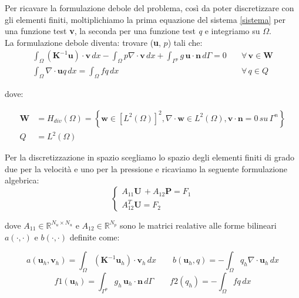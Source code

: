 Per ricavare la formulazione debole del problema, così da poter discretizzare con gli elementi finiti, moltiplichiamo la prima equazione del sistema \ref{sistema} per una funzione test \textbf{v}, la seconda per una funzione test \textit{q} e integriamo su $\Omega$. \\
La formulazione debole diventa: trovare (\textbf{u}, $p$) tali che:
\begin{equation}
\begin{split}
\int_{\Omega} (\textbf{K}^{-1} \textbf{u}) \cdot \textbf{v} \, dx  - \int_{\Omega} p \nabla \cdot \textbf{v} \, dx  + \int_{\Gamma^p} g \, \textbf{u} \cdot \textbf{n} \, d\Gamma = 0 & \quad  \forall \, \textbf{v} \in \textbf{W} \\
\int_{\Omega} \nabla \cdot \textbf{u} q \, dx = \int_{\Omega} f q \, dx & \quad \forall \, q \in Q
\end{split}
\end{equation}\label{formdebole}

dove: 

\begin{equation*}
\begin{split}
\textbf{W} &=H_{div}(\Omega) = \left \{ \textbf{w}\in [L^2(\Omega)]^2, \nabla \cdot \textbf{w} \in L^2(\Omega), \textbf{v} \cdot \textbf{n} = 0 \, su \, \Gamma^n \right \} \\
Q &= L^2(\Omega) 
\end{split}
\end{equation*}

Per la discretizzazione in spazio scegliamo lo spazio degli elementi finiti di grado due per la velocità e uno per la pressione e ricaviamo la seguente formulazione algebrica:
\begin{equation}
\begin{cases}
A_{11} \textbf{U} \, +A_{12} \textbf{P} = F_1 \\
A_{12}^T \textbf{U} = F_2
\end{cases}
\end{equation}


dove $ A_{11} \in \mathbb{R}^{N_u \times N_u}$ e $A_{12} \in \mathbb{R}^{N_p}$  sono le matrici realative alle forme bilineari $a(\cdot, \cdot)$ e $b(\cdot, \cdot)$ definite come:

$$ a(\textbf{u}_h , \textbf{v}_h)= \int_{\Omega} (\textbf{K}^{-1} \textbf{u}_h) \cdot \textbf{v}_h \, dx \qquad b(\textbf{u}_h, q) = - \int_{\Omega} q_h \nabla \cdot \textbf{u}_h \, dx  $$
$$ f1(\textbf{u}_h) = \int_{\Gamma^p} g_h \, \textbf{u}_h \cdot \textbf{n} \, d\Gamma \qquad f2(q_h) =  - \int_{\Omega} f q \, dx $$


